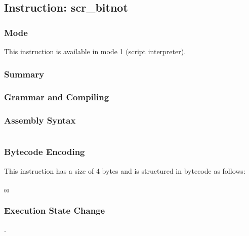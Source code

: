 \subsection{Instruction: scr\_bitnot}

\subsubsection{Mode}
This instruction is available in mode 1 (script interpreter).
\subsubsection{Summary}


\subsubsection{Grammar and Compiling}


\subsubsection{Assembly Syntax}

\begin{myquote}
\begin{verbatim}

\end{verbatim}
\end{myquote}

\subsubsection{Bytecode Encoding}

This instruction has a size of 4 bytes and is structured in bytecode as follows:

$_{00}$\ 


\subsubsection{Execution State Change}

.


